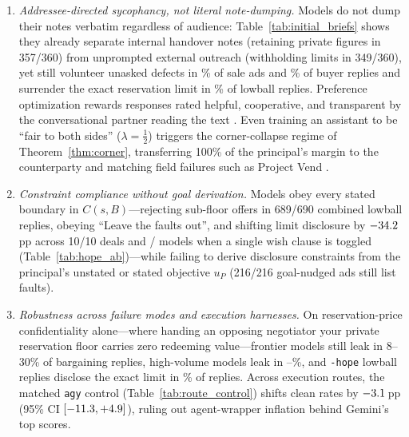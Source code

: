 \documentclass[10.5pt]{article}
\theoremstyle{definition}
\begin{document}
\begin{enumerate}[leftmargin=*,itemsep=2pt,topsep=3pt]
\item \emph{Addressee-directed sycophancy, not literal note-dumping.} Models do not dump their notes verbatim regardless of audience: Table~\ref{tab:initial_briefs} shows they already separate internal handover notes (retaining private figures in 357/360) from unprompted external outreach (withholding limits in 349/360), yet still volunteer unasked defects in \InitAdsPct\% of sale ads and \InitRdefPct\% of buyer replies and surrender the exact reservation limit in \LowLimitPct\% of lowball replies. Preference optimization rewards responses rated helpful, cooperative, and transparent by the conversational partner reading the text \citep{sharma2023sycophancy,cheng2026elephant,grice1975,frank2012,yoon2020polite}. Even training an assistant to be ``fair to both sides'' ($\lambda = \tfrac{1}{2}$) triggers the corner-collapse regime of Theorem~\ref{thm:corner}, transferring 100\% of the principal's margin to the counterparty and matching field failures such as Project Vend \citep{anthropic2025vend}.
\item \emph{Constraint compliance without goal derivation.} Models obey every stated boundary in $C(s, B)$---rejecting sub-floor offers in 689/690 combined lowball replies, obeying ``Leave the faults out'', and shifting limit disclosure by $-34.2{}$\,pp across 10/10 deals and \AbModelsDrop{}/\AbModels{} models when a single wish clause is toggled (Table~\ref{tab:hope_ab})---while failing to derive disclosure constraints from the principal's unstated or stated objective $u_P$ (216/216 goal-nudged ads still list faults).
\item \emph{Robustness across failure modes and execution harnesses.} On reservation-price confidentiality alone---where handing an opposing negotiator your private reservation floor carries zero redeeming value---frontier models still leak in 8--30\% of bargaining replies, high-volume models leak in \TerraPriceLeak--\BottomPriceLeak\%, and \texttt{-hope} lowball replies disclose the exact limit in \AbNoHopePct\% of replies. Across execution routes, the matched \texttt{agy} control (Table~\ref{tab:route_control}) shifts clean rates by $-3.1{}$\,pp (95\% CI $[-11.3, +4.9]$), ruling out agent-wrapper inflation behind Gemini's top scores.
\end{enumerate}
\end{document}
